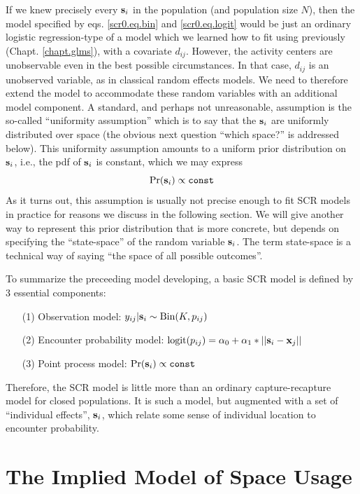 If we knew precisely every ${\bf s}_{i}$ in the population (and
population size $N$), then the model specified by
eqs. \ref{scr0.eq.bin} and \ref{scr0.eq.logit} would be just an
ordinary logistic regression-type of a model which we learned how to
fit using \winbugs previously (Chapt. \ref{chapt.glms}), with a
covariate $d_{ij}$. However, the activity centers are unobservable
even in the best possible circumstances. In that case, $d_{ij}$ is an
unobserved variable, as in classical random effects models. We need to
therefore extend the model to accommodate these random variables with
an additional model component. A standard, and perhaps not
unreasonable, assumption is the so-called ``uniformity assumption''
which is to say that the ${\bf s}_{i}$ are uniformly distributed over
space (the obvious next question ``which space?'' is addressed below).
This uniformity assumption amounts to a uniform prior distribution on
${\bf s}_{i}$, i.e., the pdf of ${\bf s}_{i}$ is constant, which we
may express
\begin{equation}
	\Pr({\bf s}_{i}) \propto \mbox{\tt const}
\label{scr0.eq.sprior}
\end{equation}
 As it turns out, this assumption is usually not precise
enough to fit SCR models in practice for reasons we discuss in the
following section.  We will give another way to represent this prior
distribution that is more concrete, but depends on specifying the
``state-space'' of the random variable ${\bf s}_{i}$. The term
state-space is a technical way of saying ``the space of all possible outcomes''.

To summarize the preceeding model developing, a basic SCR model is
defined by 3 essential components:
\begin{itemize}
\item[(1)] Observation model: $y_{ij}|{\bf s}_{i} \sim \mbox{Bin}(K, p_{ij})$
\item[(2)] Encounter probability model: $\mbox{logit}(p_{ij}) = \alpha_{0} +
  \alpha_{1}*||{\bf s}_{i}-{\bf x}_{j}||$
\item[(3)] Point process model: $\Pr({\bf s}_{i} ) \propto \mbox{\tt const}$
\end{itemize}
Therefore, the SCR model is little more than an ordinary
capture-recapture model for closed populations. It is such a model,
but augmented with a set of ``individual effects'', ${\bf s}_{i}$,
which relate some sense of individual location to encounter
probability. 




\section{The Implied Model of Space Usage}
\label{sec.scr0.implied}

